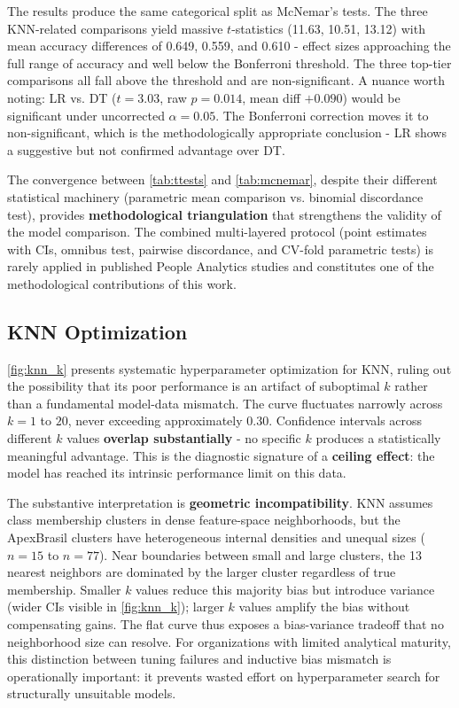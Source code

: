 \documentclass[alpha-refs,english]{RBCA_v3.0}
\begin{document}
The results produce the same categorical split as McNemar's tests. The 
three KNN-related comparisons yield massive $t$-statistics (11.63, 10.51, 
13.12) with mean accuracy differences of 0.649, 0.559, and 0.610 - effect 
sizes approaching the full range of accuracy and well below the Bonferroni 
threshold. The three top-tier comparisons all fall above the threshold and 
are non-significant. A nuance worth noting: LR vs. DT ($t = 3.03$, raw 
$p = 0.014$, mean diff $+0.090$) would be significant under uncorrected 
$\alpha = 0.05$. The Bonferroni correction moves it to non-significant, 
which is the methodologically appropriate conclusion - LR shows a 
suggestive but not confirmed advantage over DT.

The convergence between \cref{tab:ttests} and \cref{tab:mcnemar}, despite 
their different statistical machinery (parametric mean comparison vs. 
binomial discordance test), provides \textbf{methodological triangulation} 
that strengthens the validity of the model comparison. The combined 
multi-layered protocol (point estimates with CIs, omnibus test, pairwise 
discordance, and CV-fold parametric tests) is rarely applied in published 
People Analytics studies and constitutes one of the methodological 
contributions of this work.

\subsection{KNN Optimization}
\label{sec:knn_optimization}

\cref{fig:knn_k} presents systematic hyperparameter optimization for KNN, 
ruling out the possibility that its poor performance is an artifact of 
suboptimal $k$ rather than a fundamental model-data mismatch. The curve 
fluctuates narrowly across $k = 1$ to $20$, never exceeding approximately 
0.30. Confidence intervals across different $k$ values \textbf{overlap 
substantially} - no specific $k$ produces a statistically meaningful 
advantage. This is the diagnostic signature of a \textbf{ceiling effect}: 
the model has reached its intrinsic performance limit on this data.

The substantive interpretation is \textbf{geometric incompatibility}. KNN 
assumes class membership clusters in dense feature-space neighborhoods, but 
the ApexBrasil clusters have heterogeneous internal densities and unequal 
sizes ($n = 15$ to $n = 77$). Near boundaries between small and large 
clusters, the 13 nearest neighbors are dominated by the larger cluster 
regardless of true membership. Smaller $k$ values reduce this majority bias 
but introduce variance (wider CIs visible in \cref{fig:knn_k}); larger $k$ 
values amplify the bias without compensating gains. The flat curve thus 
exposes a bias-variance tradeoff that no neighborhood size can resolve. 
For organizations with limited analytical maturity, this distinction 
between tuning failures and inductive bias mismatch is operationally 
important: it prevents wasted effort on hyperparameter search for 
structurally unsuitable models.
\end{document}
